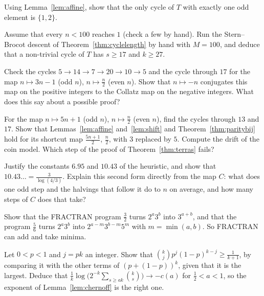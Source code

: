 \begin{exercise}[$\star\star$]\label{ex:oneodd}
Using Lemma~\ref{lem:affine}, show that the only cycle of $T$ with exactly one odd element is $\{1,2\}$.
\end{exercise}

\begin{exercise}[$\star\star$]\label{ex:cyclesmall}
Assume that every $n<100$ reaches $1$ (check a few by hand). Run the Stern--Brocot descent of Theorem~\ref{thm:cyclelength} by hand with $M=100$, and deduce
that a non-trivial cycle of $T$ has $s\ge17$ and $k\ge27$.
\end{exercise}

\begin{exercise}[$\star$]\label{ex:minusone}
Check the cycles $5\to14\to7\to20\to10\to5$ and the cycle through $17$ for the map $n\mapsto3n-1$ (odd $n$), $n\mapsto\frac n2$ (even $n$). Show that
$n\mapsto-n$ conjugates this map on the positive integers to the Collatz map on the negative integers. What does this say about a possible proof?
\end{exercise}

\begin{exercise}[$\star\star$]\label{ex:fiveone}
For the map $n\mapsto5n+1$ (odd $n$), $n\mapsto\frac n2$ (even $n$), find the cycles through $13$ and $17$. Show that Lemmas~\ref{lem:affine}
and~\ref{lem:shift} and Theorem~\ref{thm:paritybij} hold for its shortcut map $\frac{5n+1}2$, $\frac n2$, with $3$ replaced by $5$. Compute the drift of the
coin model. Which step of the proof of Theorem~\ref{thm:terras} fails?
\end{exercise}

\begin{exercise}[$\star$]\label{ex:drift}
Justify the constants $6.95$ and $10.43$ of the heuristic, and show that $10.43\ldots=\frac3{\log(4/3)}$. Explain this second form directly from the map
$C$: what does one odd step and the halvings that follow it do to $n$ on average, and how many steps of $C$ does that take?
\end{exercise}

\begin{exercise}[$\star$]\label{ex:fractran}
Show that the FRACTRAN program $\frac32$ turns $2^a3^b$ into $3^{a+b}$, and that the program $\frac5{6}$ turns $2^a3^b$ into
$2^{a-m}3^{b-m}5^m$ with $m=\min(a,b)$. So FRACTRAN can add and take minima.
\end{exercise}

\begin{exercise}[$\star\star$]\label{ex:chernoffsharp}
Let $0<p<1$ and $j=pk$ an integer. Show that $\binom kjp^j(1-p)^{k-j}\ge\frac1{k+1}$, by comparing it with the other terms of $(p+(1-p))^k$, given that it is
the largest. Deduce that $\frac1k\log\bigl(2^{-k}\sum_{s\ge ak}\binom ks\bigr)\to-c(a)$ for $\frac12<a<1$, so the exponent of Lemma~\ref{lem:chernoff} is
the right one.
\end{exercise}

